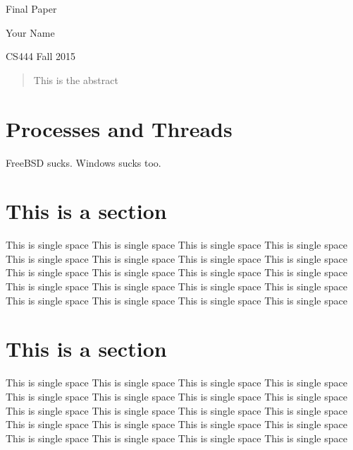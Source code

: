 \documentclass[titlepage]{article}
\begin{document}
\begin{titlepage}
\centering
{\Huge Final Paper\par}
{\LARGE Your Name\par}
{\Large CS444 Fall 2015\par}
\end{titlepage}

\begin{abstract}
\begin{singlespace}
This is the abstract
\end{singlespace}
\end{abstract}

\section{Processes and Threads}
\begin{singlespace}
    FreeBSD sucks\cite{mckusick2014design}. Windows sucks too\cite{russinovich2012windows}.
 
\end{singlespace}

\section{This is a section}
\begin{singlespace}
This is single space This is single space This is single space This is single space This is single space This is single space This is single space This is single space  This is single space This is single space This is single space This is single space  This is single space This is single space This is single space This is single space  This is single space This is single space This is single space This is single space  
\end{singlespace}

\section{This is a section}
\begin{singlespace}
This is single space This is single space This is single space This is single space This is single space This is single space This is single space This is single space  This is single space This is single space This is single space This is single space  This is single space This is single space This is single space This is single space  This is single space This is single space This is single space This is single space  
\end{singlespace}

\newpage


\end{document}
